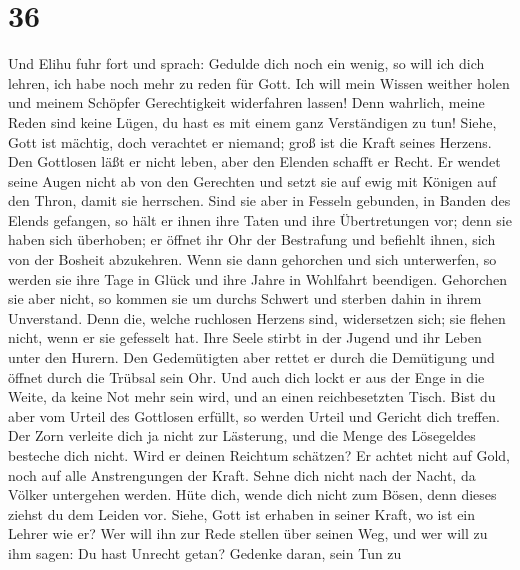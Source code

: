 \hypertarget{section-35}{%
\section{36}\label{section-35}}

 Und Elihu fuhr fort und sprach:  Gedulde
dich noch ein wenig, so will ich dich lehren, ich habe noch mehr zu
reden für Gott.  Ich will mein Wissen weither holen und
meinem Schöpfer Gerechtigkeit widerfahren lassen!  Denn
wahrlich, meine Reden sind keine Lügen, du hast es mit einem ganz
Verständigen zu tun!  Siehe, Gott ist mächtig, doch
verachtet er niemand; groß ist die Kraft seines Herzens. 
Den Gottlosen läßt er nicht leben, aber den Elenden schafft er Recht.
 Er wendet seine Augen nicht ab von den Gerechten und
setzt sie auf ewig mit Königen auf den Thron, damit sie herrschen.
 Sind sie aber in Fesseln gebunden, in Banden des Elends
gefangen,  so hält er ihnen ihre Taten und ihre
Übertretungen vor; denn sie haben sich überhoben;  er
öffnet ihr Ohr der Bestrafung und befiehlt ihnen, sich von der Bosheit
abzukehren.  Wenn sie dann gehorchen und sich
unterwerfen, so werden sie ihre Tage in Glück und ihre Jahre in
Wohlfahrt beendigen.  Gehorchen sie aber nicht, so kommen
sie um durchs Schwert und sterben dahin in ihrem Unverstand.
 Denn die, welche ruchlosen Herzens sind, widersetzen
sich; sie flehen nicht, wenn er sie gefesselt hat.  Ihre
Seele stirbt in der Jugend und ihr Leben unter den Hurern.
 Den Gedemütigten aber rettet er durch die Demütigung und
öffnet durch die Trübsal sein Ohr.  Und auch dich lockt
er aus der Enge in die Weite, da keine Not mehr sein wird, und an einen
reichbesetzten Tisch.  Bist du aber vom Urteil des
Gottlosen erfüllt, so werden Urteil und Gericht dich treffen.
 Der Zorn verleite dich ja nicht zur Lästerung, und die
Menge des Lösegeldes besteche dich nicht.  Wird er deinen
Reichtum schätzen? Er achtet nicht auf Gold, noch auf alle Anstrengungen
der Kraft.  Sehne dich nicht nach der Nacht, da Völker
untergehen werden.  Hüte dich, wende dich nicht zum
Bösen, denn dieses ziehst du dem Leiden vor.  Siehe, Gott
ist erhaben in seiner Kraft, wo ist ein Lehrer wie er? 
Wer will ihn zur Rede stellen über seinen Weg, und wer will zu ihm
sagen: Du hast Unrecht getan?  Gedenke daran, sein Tun zu
